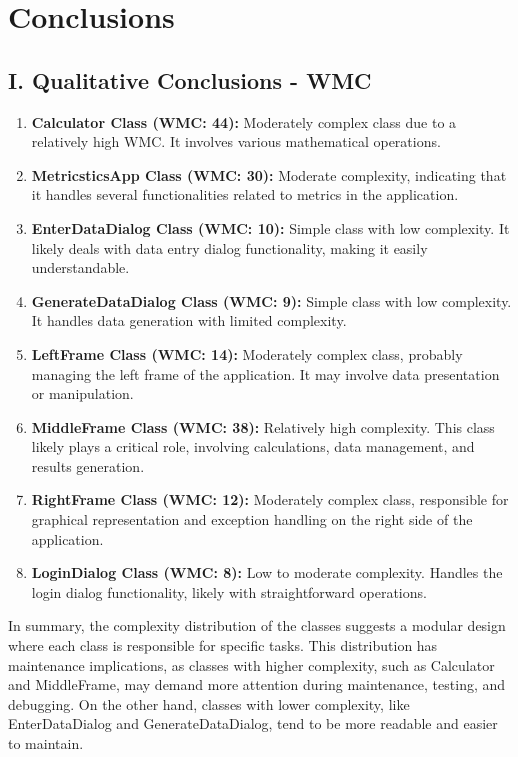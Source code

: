 \documentclass[english,12pt,a4paper]{report}
\begin{document}
	
	
	\section{Conclusions}
	\subsection*{I. Qualitative Conclusions - WMC}
	\begin{enumerate}
		\item \textbf{Calculator Class (WMC: 44):} Moderately complex class due to a relatively high WMC. It involves various mathematical operations.
		\item \textbf{MetricsticsApp Class (WMC: 30):} Moderate complexity, indicating that it handles several functionalities related to metrics in the application.
		\item \textbf{EnterDataDialog Class (WMC: 10):} Simple class with low complexity. It likely deals with data entry dialog functionality, making it easily understandable.
		\item \textbf{GenerateDataDialog Class (WMC: 9):} Simple class with low complexity. It handles data generation with limited complexity.
		\item \textbf{LeftFrame Class (WMC: 14):} Moderately complex class, probably managing the left frame of the application. It may involve data presentation or manipulation.
		\item \textbf{MiddleFrame Class (WMC: 38):} Relatively high complexity. This class likely plays a critical role, involving calculations, data management, and results generation.
		\item \textbf{RightFrame Class (WMC: 12):} Moderately complex class, responsible for graphical representation and exception handling on the right side of the application.
		\item \textbf{LoginDialog Class (WMC: 8):} Low to moderate complexity. Handles the login dialog functionality, likely with straightforward operations.
	\end{enumerate}
	
	In summary, the complexity distribution of the classes suggests a modular design where each class is responsible for specific tasks. This distribution has maintenance implications, as classes with higher complexity, such as Calculator and MiddleFrame, may demand more attention during maintenance, testing, and debugging. On the other hand, classes with lower complexity, like EnterDataDialog and GenerateDataDialog, tend to be more readable and easier to maintain.
	
\end{document}
